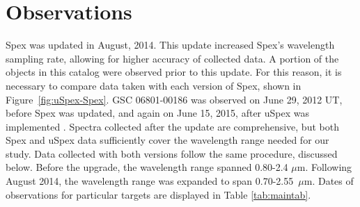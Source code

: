 \section{Observations}





Spex was updated in August, 2014.  This update increased Spex's wavelength sampling rate, allowing for higher accuracy of collected data.  
A portion of the objects in this catalog were observed prior to this update.  For this reason, it is necessary to compare data taken with each version of Spex, shown in Figure~\ref{fig:uSpex-Spex}.  
GSC 06801-00186 was observed on June 29, 2012 UT, before Spex was updated, and again on June 15, 2015, after uSpex was implemented \cite{Spextool_Manual_Cushing_2015}.  %
Spectra collected after the update are comprehensive, but both Spex and uSpex data sufficiently cover the wavelength range needed for our study.
Data collected with both versions follow the same procedure, discussed below.  Before the upgrade, the wavelength range spanned 0.80-2.4 $\mu$m.  Following August 2014, the wavelength range was expanded to span 0.70-2.55~$\mu$m.  Dates of observations for particular targets are displayed in Table \ref{tab:maintab}. \\



